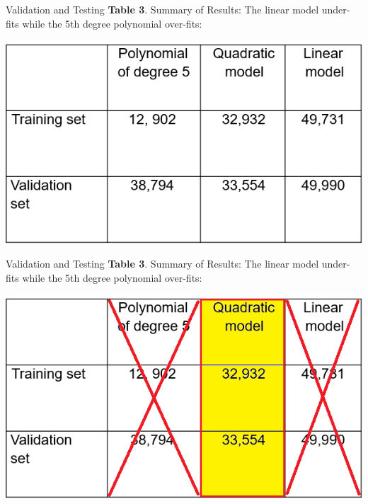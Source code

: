 \documentclass[11pt]{beamer}
\begin{document}
%
%
\begin{frame}{Validation and Testing}
\textbf{Table 3}. Summary of Results: The linear model under-fits while the 5th degree polynomial over-fits:
	\begin{center}
	\includegraphics[scale=.6]{../05-pictures/lesson-2-1_pic_8.png}
	\end{center}
\end{frame}
%
%
\begin{frame}{Validation and Testing}
\textbf{Table 3}. Summary of Results: The linear model under-fits while the 5th degree polynomial over-fits:
	\begin{center}
	\includegraphics[scale=.6]{../05-pictures/lesson-2-1_pic_9.png}
	\end{center}
\end{frame}
%
%
\end{document}
